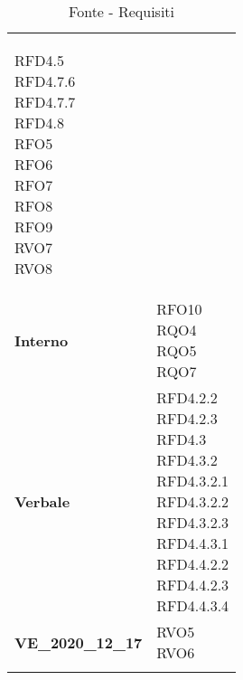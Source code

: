 \begin{longtable}[H]{| >{\centering\bfseries}p{8cm} | >{\centering\arraybackslash}p{8cm} |}
{            RFD4.5 \\
            RFD4.7.6 \\
            RFD4.7.7 \\
            RFD4.8 \\
            RFO5 \\
            RFO6 \\
            RFO7 \\
            RFO8 \\
            RFO9 \\
            RVO7 \\
            RVO8 \\
            \rule{0pt}{2ex}
        } \\

    \rowcolor{white}
    Interno &
    \makecell{
        \rule{0pt}{4ex}
        RFO10 \\
        RQO4 \\
        RQO5 \\
        RQO7 \\
        \rule{0pt}{2ex}
    } \\

    \rowcolor{white!80!lightgray!90}
    Verbale &
        \makecell{
            \rule{0pt}{4ex}
            RFD4.2.2 \\
            RFD4.2.3 \\
            RFD4.3 \\
            RFD4.3.2\\
            RFD4.3.2.1 \\
            RFD4.3.2.2 \\
            RFD4.3.2.3 \\
            RFD4.4.3.1 \\
            RFD4.4.2.2 \\
            RFD4.4.2.3 \\
            RFD4.4.3.4 \\
            \rule{0pt}{2ex}
        } \\
		
	\rowcolor{white}
    \textsc{VE\_2020\_12\_17} &
    \makecell{
        \rule{0pt}{4ex}
		RVO5 \\
        RVO6 \\
        \rule{0pt}{2ex}
    } \\

    \hline
    \rowcolor{white}
    \caption{Fonte - Requisiti}
    \label{tab:fonte_requisiti}
\end{longtable}


